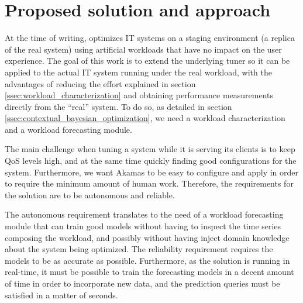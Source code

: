 \documentclass[a4paper, 12pt]{article} %
\begin{document}
	\section{Proposed solution and approach } \label{sec:proposed_solution}
	At the time of writing, \cite{AkamasCGP} optimizes IT systems on a staging environment (a replica of the real system) using artificial workloads that have no impact on the user experience. The goal of this work is to extend the underlying tuner so it can be applied to the actual IT system running under the real workload, with the advantages of reducing the effort explained in section \ref{ssec:workload_characterization} and obtaining performance measurements directly from the ``real'' system. To do so, as detailed in section \ref{ssec:contextual_bayesian_optimization}, we need a workload characterization and a workload forecasting module.
	
	The main challenge when tuning a system while it is serving its clients is to keep QoS levels high, and at the same time quickly finding good configurations for the system. Furthermore, we want Akamas to be easy to configure and apply in order to require the minimum amount of human work. Therefore, the requirements for the solution are to be autonomous and reliable.
	
	The autonomous requirement translates to the need of a workload forecasting module that can train good models without having to inspect the time series composing the workload, and possibly without having inject domain knowledge about the system being optimized. The reliability requirement requires the models to be as accurate as possible. Furthermore, as the solution is running in real-time, it must be possible to train the forecasting models in a decent amount of time in order to incorporate new data, and the prediction queries must be satisfied in a matter of seconds.
	
\end{document}

